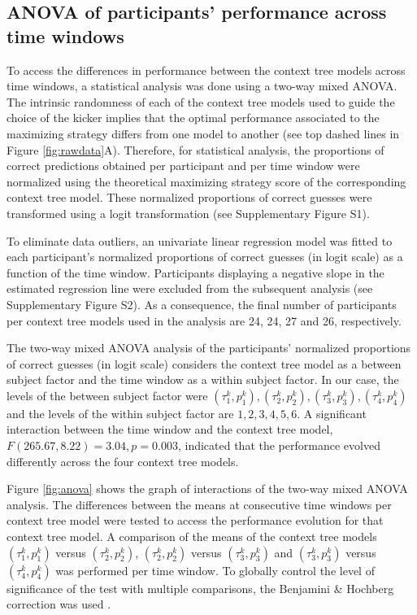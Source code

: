 \documentclass[fleqn,10pt]{wlscirep}
\begin{document}
\subsection*{ANOVA of participants' performance across time windows}

To access the differences in performance between the context tree models across time windows, a statistical analysis was done using a two-way mixed ANOVA. The intrinsic randomness of each of the context tree models used to guide the choice of the kicker implies that the optimal performance associated to the maximizing strategy differs from one model to another (see top dashed lines in Figure \ref{fig:rawdata}A). Therefore, for statistical analysis, the proportions of correct predictions obtained per participant and per time window were normalized using the theoretical maximizing strategy score of the corresponding context tree model. These normalized proportions of correct guesses were transformed using a logit transformation (see Supplementary Figure S1).               

To eliminate data outliers, an univariate linear regression model was fitted to each participant's normalized proportions of correct guesses (in logit scale) as a function of the time window. Participants displaying a negative slope in the estimated regression line were excluded from the subsequent analysis (see Supplementary Figure S2). As a consequence, the final number of participants per context tree models used in the analysis are 24, 24, 27 and 26, respectively.    

The two-way mixed ANOVA analysis of the participants' normalized proportions of correct guesses (in logit scale) considers the context tree model as a between subject factor and the time window as a within subject factor. In our case, the levels of the between subject factor were $(\tau^k_1, p^k_1), (\tau^k_2, p^k_2), (\tau^k_3, p^k_3), (\tau^k_4, p^k_4)$ and the levels of the within subject factor are $1, 2, 3, 4, 5, 6$. A significant interaction between the time window and the context tree model, $F(265.67, 8.22) = 3.04, p=0.003$, indicated that the performance evolved differently across the four context tree models.

Figure \ref{fig:anova} shows the graph of interactions of the two-way mixed ANOVA analysis. The differences between the means at consecutive time windows per context tree model were tested to access the performance evolution for that context tree model. A comparison of the means of the context tree models $(\tau^k_1, p^k_1)$ versus $(\tau^k_2, p^k_2)$, $(\tau^k_2, p^k_2)$ versus $(\tau^k_3, p^k_3)$ and $(\tau^k_3, p^k_3)$ versus $(\tau^k_4, p^k_4)$ was performed per time window. To globally control the level of significance of the test with multiple comparisons, the Benjamini \& Hochberg correction was used \cite{Benjamini1995}. 
\end{document}
